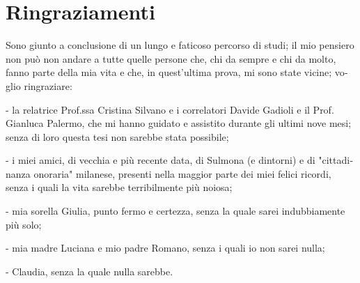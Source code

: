 \chapter*{Ringraziamenti}

\begin{otherlanguage}{italian}





Sono giunto a conclusione di un lungo e faticoso percorso di studi; il mio pensiero non può non andare a tutte quelle persone che, chi da sempre e chi da molto, fanno parte della mia vita e che, in quest'ultima prova, mi sono state vicine; voglio ringraziare:





- la relatrice Prof.ssa Cristina Silvano e i correlatori Davide Gadioli e il Prof. Gianluca Palermo, che mi hanno guidato e assistito durante gli ultimi nove mesi; senza di loro questa tesi non sarebbe stata possibile;





- i miei amici, di vecchia e più recente data, di Sulmona (e dintorni) e di "cittadinanza onoraria" milanese, presenti nella maggior parte dei miei felici ricordi, senza i quali la vita sarebbe terribilmente più noiosa;





- mia sorella Giulia, punto fermo e certezza, senza la quale sarei indubbiamente più solo;





- mia madre Luciana e mio padre Romano, senza i quali io non sarei nulla;





- Claudia, senza la quale nulla sarebbe.





\end{otherlanguage}
